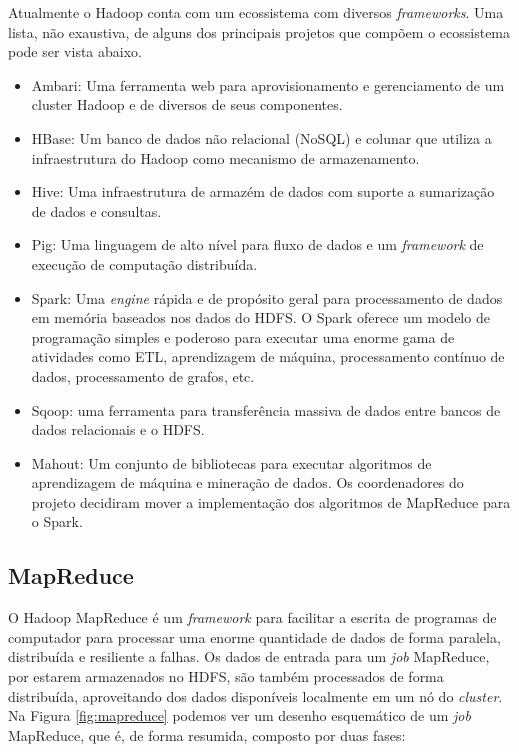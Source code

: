 Atualmente o Hadoop conta com um ecossistema com diversos \textit{frameworks}. Uma lista, não exaustiva, 
de alguns dos principais projetos que compõem o ecossistema pode ser vista abaixo.

\begin{itemize}
	\item Ambari: Uma ferramenta web para aprovisionamento e gerenciamento de um cluster Hadoop e de diversos de seus componentes.
	\item HBase: Um banco de dados não relacional (NoSQL) e colunar que utiliza a infraestrutura do Hadoop como mecanismo de armazenamento.
	\item Hive: Uma infraestrutura de armazém de dados com suporte a sumarização de dados e consultas.
	\item Pig: Uma linguagem de alto nível para fluxo de dados e um \textit{framework} de execução de computação distribuída. 
	\item Spark: Uma \textit{engine} rápida e de propósito geral para processamento de dados em memória baseados nos dados do HDFS. O Spark oferece um modelo de programação simples e poderoso para executar uma enorme gama de atividades como ETL, aprendizagem de máquina, processamento contínuo de dados, processamento de grafos, etc.
	\item Sqoop: uma ferramenta para transferência massiva de dados entre bancos de dados relacionais e o HDFS.
	\item Mahout: Um conjunto de bibliotecas para executar algoritmos de aprendizagem de máquina e mineração de dados. Os coordenadores do projeto decidiram mover a implementação dos algoritmos de MapReduce para o Spark.
\end{itemize}

\subsection{MapReduce}

O Hadoop MapReduce é um \textit{framework} para facilitar a escrita de programas de computador para 
processar uma enorme quantidade de dados de forma paralela, distribuída e resiliente a falhas. Os dados 
de entrada para um \textit{job} MapReduce, por estarem armazenados no HDFS, são também processados 
de forma distribuída, aproveitando dos dados disponíveis localmente em um nó do \textit{cluster}. 
Na Figura \ref{fig:mapreduce} podemos ver um desenho esquemático de um \textit{job} MapReduce, que é, 
de forma resumida, composto por duas fases:

